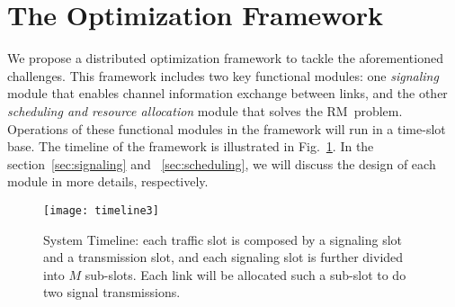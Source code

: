 \documentclass[conference]{IEEEtran}
\begin{document}
\section{The Optimization Framework}
We propose a distributed optimization framework to tackle the aforementioned challenges. This framework includes two key functional modules: one \emph{signaling} module that enables channel information exchange between links, and the other \emph{scheduling and resource allocation} module that solves the RM~problem.
Operations of these functional modules in the framework will run in a time-slot base. The timeline of the framework is illustrated in Fig.~\ref{fig:timeline}. In the section~\ref{sec:signaling} and ~\ref{sec:scheduling}, we will discuss the design of each module in more details, respectively.
















\begin{figure}[htb]
\centering
\texttt{[image: timeline3]}
\caption{System Timeline: each traffic slot is composed by a signaling slot and a transmission slot, and each signaling slot is further divided into $M$ sub-slots. Each link will be allocated such a sub-slot to do two signal transmissions.}
\label{fig:timeline}
\end{figure}
\end{document}
